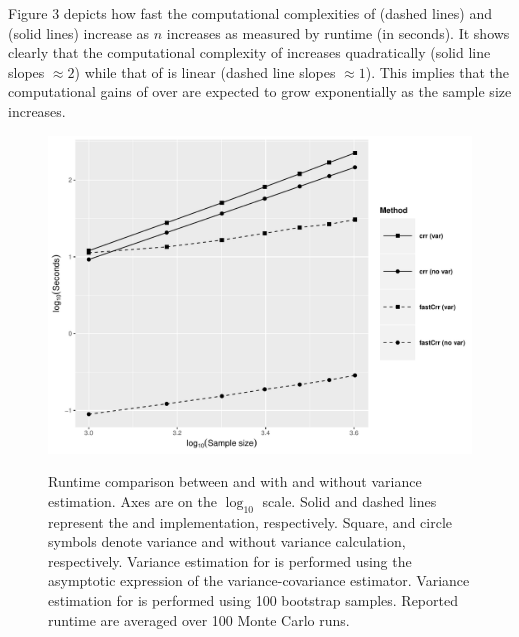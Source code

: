 Figure 3 depicts how fast the computational complexities of    (dashed lines) and  (solid lines) increase as $n$ increases as measured by runtime  (in seconds). It shows clearly that the computational complexity of   increases quadratically (solid line slopes $\approx 2$) while that of  is linear (dashed line slopes $\approx 1$). This implies that  the computational gains of  over   are expected to grow exponentially as the sample size increases.  
\begin{figure}[t]
\centering
\includegraphics[scale = 0.6]{plots/log_NOPEN-eps-converted-to.pdf}
\label{fig3:timing}
\caption{Runtime comparison between  and  with and without variance estimation. Axes are on the $\log_{10}$ scale. Solid and dashed lines represent the  and  implementation, respectively. Square, and circle symbols denote variance and without variance calculation, respectively. Variance estimation for  is performed using the asymptotic expression of the variance-covariance estimator. Variance estimation for  is performed using 100 bootstrap samples. Reported runtime are averaged over 100 Monte Carlo runs.}
\end{figure}

